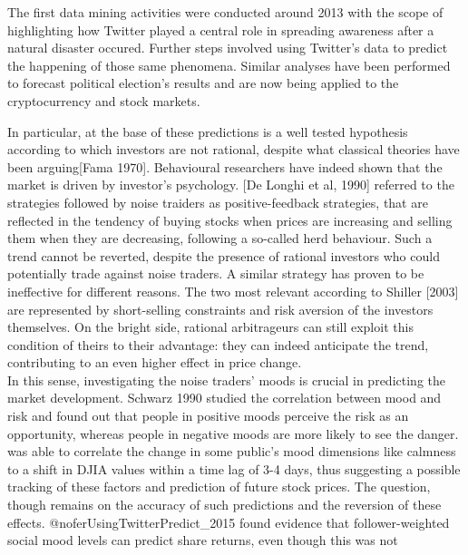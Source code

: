 \documentclass[
]{article}
\begin{document}
The first data mining activities were conducted around 2013 with the
scope of highlighting how Twitter played a central role in spreading
awareness after a natural disaster
occured\autocite{gunawongSocialNetworkReactions2013}. Further steps
involved using Twitter's data to predict the happening of those same
phenomena\autocite{fitrianyAssessmentUseMeteorological2021,songSentimentAwareContextualModel2021,palshikarWeaklySupervisedOnline2018}.
Similar analyses have been performed to forecast political election's
results\autocite{hubertyCanWeVote2015} and are now being applied to the
cryptocurrency and stock markets.

In particular, at the base of these predictions is a well tested
hypothesis according to which investors are not rational, despite what
classical theories have been arguing{[}Fama 1970{]}. Behavioural
researchers have indeed shown that the market is driven by investor's
psychology. {[}De Longhi et al, 1990{]} referred to the strategies
followed by noise traiders as positive-feedback strategies, that are
reflected in the tendency of buying stocks when prices are increasing
and selling them when they are decreasing, following a so-called herd
behaviour. Such a trend cannot be reverted, despite the presence of
rational investors who could potentially trade against noise traders. A
similar strategy has proven to be ineffective for different reasons. The
two most relevant according to Shiller {[}2003{]} are represented by
short-selling constraints and risk aversion of the investors themselves.
On the bright side, rational arbitrageurs can still exploit this
condition of theirs to their advantage: they can indeed anticipate the
trend, contributing to an even higher effect in price change.\\
In this sense, investigating the noise traders' moods is crucial in
predicting the market development. Schwarz 1990 studied the correlation
between mood and risk and found out that people in positive moods
perceive the risk as an opportunity, whereas people in negative moods
are more likely to see the danger. \autocite{TwitterMoodPredicts} was
able to correlate the change in some public's mood dimensions like
calmness to a shift in DJIA values within a time lag of 3-4 days, thus
suggesting a possible tracking of these factors and prediction of future
stock prices. The question, though remains on the accuracy of such
predictions and the reversion of these effects.
@noferUsingTwitterPredict\_2015 found evidence that follower-weighted
social mood levels can predict share returns, even though this was not
\end{document}
